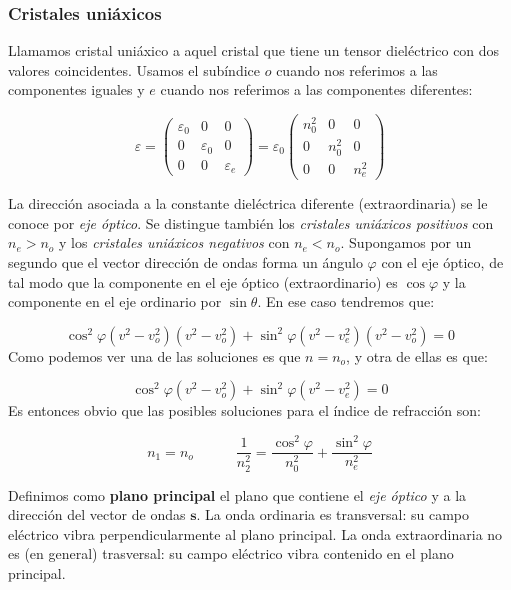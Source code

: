 \documentclass[12pt]{article}
\newcommand{\tquad}{\quad \quad \quad}
\newcommand{\sn}{\mathbf{s}}
\numberwithin{equation}{section}
\numberwithin{figure}{section}
\begin{document}
\subsubsection{Cristales uniáxicos}

Llamamos cristal uniáxico a aquel cristal que tiene un tensor dieléctrico  con dos valores coincidentes. Usamos el subíndice $o$ cuando nos referimos a las componentes iguales y $e$ cuando nos referimos a las componentes diferentes:

\begin{equation}
\varepsilon = \begin{pmatrix}
\varepsilon_0 & 0 & 0 \\
0 & \varepsilon_0 & 0 \\
0 & 0 & \varepsilon_e
\end{pmatrix} = \varepsilon_0 
\begin{pmatrix}
n^2_0 & 0 & 0 \\
0 & n^2_0 & 0 \\
0 & 0 & n^2_e 
\end{pmatrix}
\end{equation}

La dirección asociada a la constante dieléctrica diferente (extraordinaria) se le conoce por \textit{eje óptico}. Se distingue también los \textit{cristales uniáxicos positivos} con $n_e>n_o$ y los \textit{cristales uniáxicos negativos} con $n_e<n_o$. Supongamos por un segundo que el vector dirección de ondas forma un ángulo $\varphi$ con el eje óptico, de tal modo que la componente en el eje óptico (extraordinario) es $\cos \varphi$ y la componente en el eje ordinario por $\sin \theta$. En ese caso tendremos que:

\begin{equation}
\cos^2 \varphi (v^2 - v_o^2)(v^2-v_o^2)+ \sin^2 \varphi (v^2 - v_e^2)(v^2-v_o^2) = 0
\end{equation}
Como podemos ver una de las soluciones es que $n=n_o$, y otra de ellas es que:

$$ \cos^2 \varphi (v^2 - v_o^2)+ \sin ^2\varphi (v^2 - v_e^2) = 0 $$
Es entonces obvio que las posibles soluciones para el índice de refracción son:

\begin{equation}
n_1 = n_o \tquad \dfrac{1}{n_2^2} = \dfrac{\cos^2 \varphi}{n_0^2} + \dfrac{\sin^2 \varphi}{n_e^2} \label{Ec:10.2.4.15}
\end{equation}

Definimos como \textbf{plano principal} el plano que contiene el \textit{eje óptico} y a la dirección del vector de ondas $\sn$. La onda ordinaria es transversal: su campo eléctrico vibra perpendicularmente al plano principal. La onda extraordinaria no es (en general) trasversal: su campo eléctrico vibra contenido en el plano principal.
\end{document}
